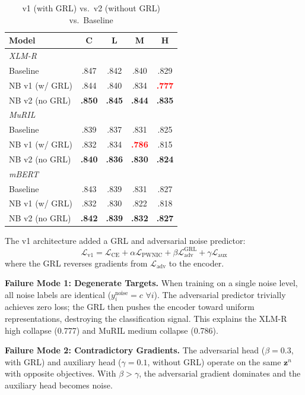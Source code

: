 \documentclass[conference]{IEEEtran}
\begin{document}
\begin{table}[H]
\caption{v1 (with GRL) vs.\ v2 (without GRL) vs.\ Baseline}
\label{tab:ablation}
\centering
\small
\begin{tabular}{l@{\hskip 6pt}cccc}
\toprule
\textbf{Model} & \textbf{C} & \textbf{L} & \textbf{M} & \textbf{H} \\
\midrule
\multicolumn{5}{l}{\textit{XLM-R}} \\
Baseline       & .847 & .842 & .840 & .829 \\
NB v1 (w/ GRL) & .844 & .840 & .834 & \textcolor{red}{\textbf{.777}} \\
NB v2 (no GRL) & \textbf{.850} & \textbf{.845} & \textbf{.844} & \textbf{.835} \\
\midrule
\multicolumn{5}{l}{\textit{MuRIL}} \\
Baseline       & .839 & .837 & .831 & .825 \\
NB v1 (w/ GRL) & .832 & .834 & \textcolor{red}{\textbf{.786}} & .815 \\
NB v2 (no GRL) & \textbf{.840} & \textbf{.836} & \textbf{.830} & \textbf{.824} \\
\midrule
\multicolumn{5}{l}{\textit{mBERT}} \\
Baseline       & .843 & .839 & .831 & .827 \\
NB v1 (w/ GRL) & .832 & .830 & .822 & .818 \\
NB v2 (no GRL) & \textbf{.842} & \textbf{.839} & \textbf{.832} & \textbf{.827} \\
\bottomrule
\end{tabular}
\end{table}


The v1 architecture added a GRL and adversarial noise predictor:
\begin{equation}
\mathcal{L}_{\text{v1}} = \mathcal{L}_\text{CE} + \alpha \mathcal{L}_{\text{PWNIC}} + \beta \mathcal{L}_\text{adv}^{\text{GRL}} + \gamma \mathcal{L}_\text{aux}
\end{equation}
where the GRL reverses gradients from $\mathcal{L}_\text{adv}$ to the encoder.

\textbf{Failure Mode 1: Degenerate Targets.} When training on a single noise level, all noise labels are identical ($y_i^\text{noise} = c$ $\forall i$). The adversarial predictor trivially achieves zero loss; the GRL then pushes the encoder toward uniform representations, destroying the classification signal. This explains the XLM-R high collapse (0.777) and MuRIL medium collapse (0.786).

\textbf{Failure Mode 2: Contradictory Gradients.} The adversarial head ($\beta = 0.3$, with GRL) and auxiliary head ($\gamma = 0.1$, without GRL) operate on the same $\mathbf{z}^n$ with opposite objectives. With $\beta > \gamma$, the adversarial gradient dominates and the auxiliary head becomes noise.
\end{document}

